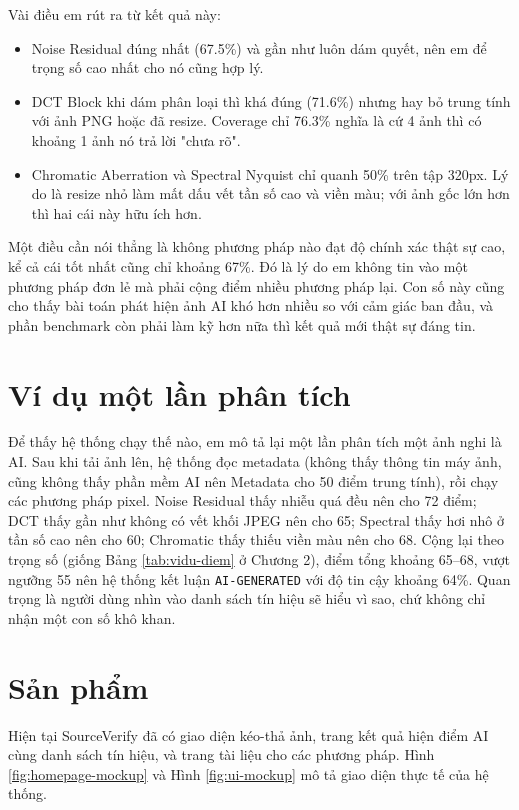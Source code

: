Vài điều em rút ra từ kết quả này:
\begin{itemize}
  \item Noise Residual đúng nhất (67.5\%) và gần như luôn dám quyết, nên em để trọng số cao nhất cho nó cũng hợp lý.
  \item DCT Block khi dám phân loại thì khá đúng (71.6\%) nhưng hay bỏ trung tính với ảnh PNG hoặc đã resize. Coverage chỉ 76.3\% nghĩa là cứ 4 ảnh thì có khoảng 1 ảnh nó trả lời "chưa rõ".
  \item Chromatic Aberration và Spectral Nyquist chỉ quanh 50\% trên tập 320px. Lý do là resize nhỏ làm mất dấu vết tần số cao và viền màu; với ảnh gốc lớn hơn thì hai cái này hữu ích hơn.
\end{itemize}

Một điều cần nói thẳng là không phương pháp nào đạt độ chính xác thật sự cao, kể cả cái tốt nhất cũng chỉ khoảng 67\%. Đó là lý do em không tin vào một phương pháp đơn lẻ mà phải cộng điểm nhiều phương pháp lại. Con số này cũng cho thấy bài toán phát hiện ảnh AI khó hơn nhiều so với cảm giác ban đầu, và phần benchmark còn phải làm kỹ hơn nữa thì kết quả mới thật sự đáng tin.

\section{Ví dụ một lần phân tích}
Để thấy hệ thống chạy thế nào, em mô tả lại một lần phân tích một ảnh nghi là AI. Sau khi tải ảnh lên, hệ thống đọc metadata (không thấy thông tin máy ảnh, cũng không thấy phần mềm AI nên Metadata cho 50 điểm trung tính), rồi chạy các phương pháp pixel. Noise Residual thấy nhiễu quá đều nên cho 72 điểm; DCT thấy gần như không có vết khối JPEG nên cho 65; Spectral thấy hơi nhô ở tần số cao nên cho 60; Chromatic thấy thiếu viền màu nên cho 68. Cộng lại theo trọng số (giống Bảng \ref{tab:vidu-diem} ở Chương 2), điểm tổng khoảng 65--68, vượt ngưỡng 55 nên hệ thống kết luận \texttt{AI-GENERATED} với độ tin cậy khoảng 64\%. Quan trọng là người dùng nhìn vào danh sách tín hiệu sẽ hiểu vì sao, chứ không chỉ nhận một con số khô khan.

\section{Sản phẩm}
Hiện tại SourceVerify đã có giao diện kéo-thả ảnh, trang kết quả hiện điểm AI cùng danh sách tín hiệu, và trang tài liệu cho các phương pháp. Hình \ref{fig:homepage-mockup} và Hình \ref{fig:ui-mockup} mô tả giao diện thực tế của hệ thống.

